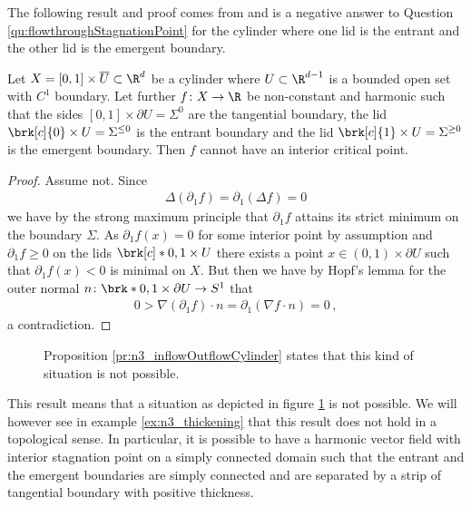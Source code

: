 The following result and proof comes from \cite[§6]{Douglas2020} and is a negative answer to Question \ref{qu:flowthroughStagnationPoint}
for the cylinder where one lid is the entrant and the other lid is the emergent boundary.
\begin{proposition}\label{pr:n3_inflowOutflowCylinder}
  Let $X=[0,1]\times \overline{U}\subset\R^d$ be a cylinder where $U\subset\R^{d-1}$ is a bounded open set with $C^1$ boundary.
  Let further $f\colon X\to\R$ be non-constant and
  harmonic such that the sides
  $[0,1]\times \partial U=\Sigma^0$ are the tangential boundary,
  the lid $\brk[c]{0}\times U=\Sigma^{\leq0}$ is the entrant boundary and
  the lid $\brk[c]{1}\times U=\Sigma^{\geq0}$ is the emergent boundary. 
  Then $f$ cannot have an interior critical point.
\end{proposition}
\begin{proof}
  Assume not. Since
  \begin{align*}
    \Delta(\partial_1f)=\partial_1(\Delta f)=0
  \end{align*}
  we have by the strong maximum principle that $\partial_1 f$ attains its strict minimum on the boundary $\Sigma$. As $\partial_1 f(x)=0$ for some interior point 
  by assumption and $\partial_1 f\geq0$ on the lids $\brk[c]*{0,1}\times U$ there exists a point
  $x\in(0,1)\times \partial U$ such that $\partial_1f(x)<0$ is minimal on $X$. But then we have by Hopf's lemma
  for the outer normal $n\colon\brk*{0,1}\times\partial U\to S^1$ that
  \begin{align*}
    0>\nabla (\partial_1f)\cdot n=\partial_1(\nabla f\cdot n)=0\,,
  \end{align*}
  a contradiction.
\end{proof}
\begin{figure}
  \centering
  
  \caption{Proposition \ref{pr:n3_inflowOutflowCylinder} states that this kind of situation is not possible.}
  \label{fi:n3_cylinder}
\end{figure}
This result means that a situation as depicted in figure \ref{fi:n3_cylinder} is not possible. We will however see in example
\ref{ex:n3_thickening} that this result does not hold in a topological sense.
In particular, it is possible to have a harmonic vector field with interior stagnation point on a simply connected domain such that
the entrant and the emergent boundaries are simply connected and are separated by a strip of tangential boundary with positive thickness.

